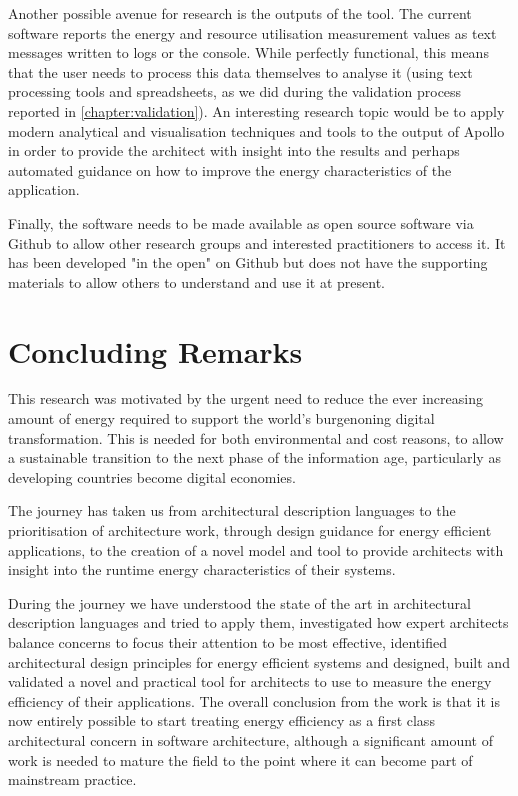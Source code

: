 Another possible avenue for research is the outputs of the tool.  The current software reports the energy and resource utilisation measurement values as text messages written to logs or the console.  While perfectly functional, this means that the user needs to process this data themselves to analyse it (using text processing tools and spreadsheets, as we did during the validation process reported in \cref{chapter:validation}).  An interesting research topic would be to apply modern analytical and visualisation techniques and tools to the output of Apollo in order to provide the architect with insight into the results and perhaps automated guidance on how to improve the energy characteristics of the application.

Finally, the software needs to be made available as open source software via Github to allow other research groups and interested practitioners to access it.  It has been developed "in the open" on Github but does not have the supporting materials to allow others to understand and use it at present.

\section{Concluding Remarks}

This research was motivated by the urgent need to reduce the ever increasing amount of energy required to support the world's burgenoning digital transformation.  This is needed for both environmental and cost reasons, to allow a sustainable transition to the next phase of the information age, particularly as developing countries become digital economies.

The journey has taken us from architectural description languages to the prioritisation of architecture work, through design guidance for energy efficient applications, to the creation of a novel model and tool to provide architects with insight into the runtime energy characteristics of their systems.

During the journey we have understood the state of the art in architectural description languages and tried to apply them, investigated how expert architects balance concerns to focus their attention to be most effective, identified architectural design principles for energy efficient systems and designed, built and validated a novel and practical tool for architects to use to measure the energy efficiency of their applications.  The overall conclusion from the work is that it is now entirely possible to start treating energy efficiency as a first class architectural concern in software architecture, although a significant amount of work is needed to mature the field to the point where it can become part of mainstream practice.

